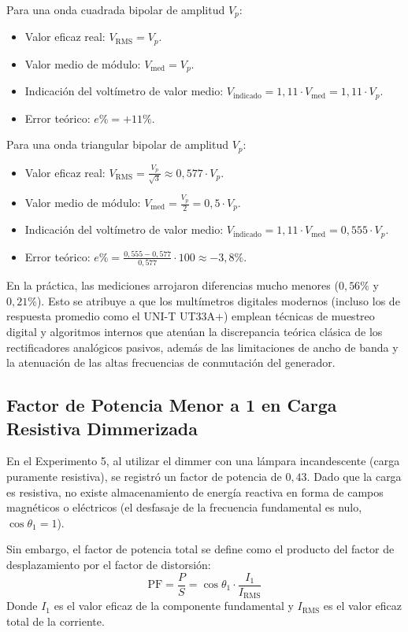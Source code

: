 Para una onda cuadrada bipolar de amplitud $V_p$:
\begin{itemize}
    \item Valor eficaz real: $V_{\text{RMS}} = V_p$.
    \item Valor medio de módulo: $V_{\text{med}} = V_p$.
    \item Indicación del voltímetro de valor medio: $V_{\text{indicado}} = 1,11 \cdot V_{\text{med}} = 1,11 \cdot V_p$.
    \item Error teórico: $e\% = +11\%$.
\end{itemize}

Para una onda triangular bipolar de amplitud $V_p$:
\begin{itemize}
    \item Valor eficaz real: $V_{\text{RMS}} = \frac{V_p}{\sqrt{3}} \approx 0,577 \cdot V_p$.
    \item Valor medio de módulo: $V_{\text{med}} = \frac{V_p}{2} = 0,5 \cdot V_p$.
    \item Indicación del voltímetro de valor medio: $V_{\text{indicado}} = 1,11 \cdot V_{\text{med}} = 0,555 \cdot V_p$.
    \item Error teórico: $e\% = \frac{0,555 - 0,577}{0,577} \cdot 100 \approx -3,8\%$.
\end{itemize}

En la práctica, las mediciones arrojaron diferencias mucho menores ($0,56\%$ y $0,21\%$). Esto se atribuye a que los
multímetros digitales modernos (incluso los de respuesta promedio como el UNI-T UT33A+) emplean técnicas de muestreo
digital y algoritmos internos que atenúan la discrepancia teórica clásica de los rectificadores analógicos pasivos,
además de las limitaciones de ancho de banda y la atenuación de las altas frecuencias de conmutación del generador.


\subsection{Factor de Potencia Menor a 1 en Carga Resistiva Dimmerizada}
En el Experimento 5, al utilizar el dimmer con una lámpara incandescente (carga puramente resistiva), se registró un
factor de potencia de $0,43$. Dado que la carga es resistiva, no existe almacenamiento de energía reactiva en forma
de campos magnéticos o eléctricos (el desfasaje de la frecuencia fundamental es nulo, $\cos\theta_1 = 1$).

Sin embargo, el factor de potencia total se define como el producto del factor de desplazamiento por el factor de
distorsión:
\begin{equation}
    \text{PF} = \frac{P}{S} = \cos\theta_1 \cdot \frac{I_1}{I_{\text{RMS}}}
\end{equation}
Donde $I_1$ es el valor eficaz de la componente fundamental y $I_{\text{RMS}}$ es el valor eficaz total de la corriente.

